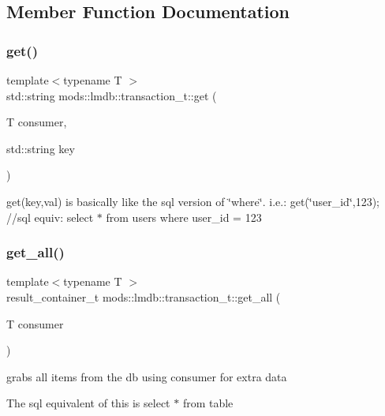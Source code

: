 \subsection{Member Function Documentation}
\mbox{\label{structmods_1_1lmdb_1_1transaction__t_a893faeea3f9f9a0875d0522c6c7de5b6}} 
\subsubsection{\texorpdfstring{get()}{get()}}
{\footnotesize\ttfamily template$<$typename T $>$ \\
std\+::string mods\+::lmdb\+::transaction\+\_\+t\+::get (\begin{DoxyParamCaption}\item[{T}]{consumer,  }\item[{std\+::string}]{key }\end{DoxyParamCaption})}

get(key,val) is basically like the sql version of \char`\"{}where\char`\"{}. i.\+e.\+: get(\char`\"{}user\+\_\+id\char`\"{},123); //sql equiv\+: select $\ast$ from users where user\+\_\+id = 123 \mbox{\label{structmods_1_1lmdb_1_1transaction__t_a89e078b5a572044e71ee239589ea334f}} 
\subsubsection{\texorpdfstring{get\+\_\+all()}{get\_all()}}
{\footnotesize\ttfamily template$<$typename T $>$ \\
result\+\_\+container\+\_\+t mods\+::lmdb\+::transaction\+\_\+t\+::get\+\_\+all (\begin{DoxyParamCaption}\item[{T}]{consumer }\end{DoxyParamCaption})}



grabs all items from the db using consumer for extra data 

The sql equivalent of this is \textquotesingle{}select $\ast$ from table\textquotesingle{}

